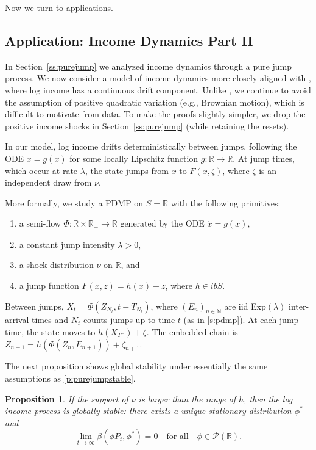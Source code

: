 \documentclass[12pt,reqno]{amsart}
\numberwithin{equation}{section}
\newtheorem{proposition}{Proposition}[section]
\theoremstyle{definition}
\newcommand{\1}{\mathbbm{1}}
\newcommand{\RR}{\mathbb{R}}
\newcommand{\NN}{\mathbb{N}}
\newcommand{\pP}{\mathscr{P}}
\newcommand{\lam}{\lambda}
\begin{document}
Now we turn to applications.


\subsection{Application: Income Dynamics Part II}\label{ss:driftmodel}

In Section~\ref{ss:purejump} we analyzed income dynamics through a pure jump
process. We now consider a model of income dynamics more closely aligned with \citet{gabaix2016dynamics},
where log income has a continuous drift component.  Unlike
\cite{gabaix2016dynamics}, we continue to avoid
the assumption of positive quadratic variation (e.g., Brownian motion), which is
difficult to motivate from data.  To make the proofs slightly simpler, we drop
the positive income shocks in Section~\ref{ss:purejump} (while retaining the
resets).

In our model, log income drifts deterministically between jumps,
following the ODE $\dot x = g(x)$ for some locally Lipschitz function $g \colon
\RR \to \RR$. At jump times, which occur at rate $\lambda$,
the state jumps from $x$ to $F(x, \zeta)$, where $\zeta$ is an independent draw
from $\nu$.

More formally, we study a PDMP on $S = \RR$ with the following primitives:
%
\begin{enumerate}
    \item a semi-flow $\Phi \colon \RR \times \RR_+ \to \RR$ generated by the ODE
        $\dot x = g(x)$,
    \item a constant jump intensity $\lam > 0$,
    \item a shock distribution $\nu$ on $\RR$, and
    \item a jump function $F(x, z) = h(x) + z$, where $h \in ibS$.
\end{enumerate}
%
Between jumps, $X_t = \Phi(Z_{N_t}, t - T_{N_t})$, where $(E_n)_{n \in \NN}$
are {\sc iid} Exp$(\lam)$ inter-arrival times and $N_t$ counts jumps up to time $t$
(as in \cref{s:pdmp}).  At each jump time, the state moves to
$h(X_{T^-}) + \zeta$.  The embedded chain is
$Z_{n+1} = h(\Phi(Z_n, E_{n+1})) + \zeta_{n+1}$.

The next proposition shows global stability under essentially the same
assumptions as \cref{p:purejumpstable}.

\begin{proposition}\label{p:driftincomestable}
    If the support of $\nu$ is larger than the range of $h$, then the log income
    process is globally stable: there exists a unique stationary distribution
    $\phi^*$ and
    \begin{equation}\label{eq:driftgs}
        \lim_{t \to \infty} \beta(\phi P_t, \phi^*) = 0
        \quad \text{for all} \quad \phi \in \pP(\RR).
    \end{equation}
\end{proposition}
\end{document}
